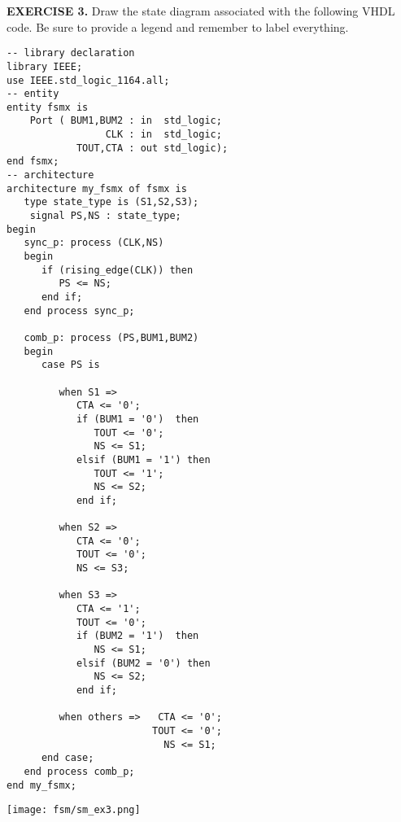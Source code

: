 \vspace{20pt}
\noindent
\begin{minipage}{1\textwidth}
\textbf{EXERCISE 3.}
Draw the state diagram associated with the following VHDL code. Be sure to provide a legend and remember to label everything.
\end{minipage}
\begin{minipage}{0.66\textwidth}
\vspace{10px}
\begin{lstlisting}
-- library declaration
library IEEE;
use IEEE.std_logic_1164.all;
-- entity
entity fsmx is
    Port ( BUM1,BUM2 : in  std_logic;
                 CLK : in  std_logic;
            TOUT,CTA : out std_logic);
end fsmx;
-- architecture
architecture my_fsmx of fsmx is
   type state_type is (S1,S2,S3);
	signal PS,NS : state_type;
begin
   sync_p: process (CLK,NS)
   begin
      if (rising_edge(CLK)) then
         PS <= NS;
      end if;
   end process sync_p;

   comb_p: process (PS,BUM1,BUM2)
   begin
      case PS is

         when S1 =>
            CTA <= '0';
            if (BUM1 = '0')  then
               TOUT <= '0';
               NS <= S1;
            elsif (BUM1 = '1') then
               TOUT <= '1';
               NS <= S2;
            end if;

         when S2 =>
            CTA <= '0';
            TOUT <= '0';
            NS <= S3;

         when S3 =>
            CTA <= '1';
            TOUT <= '0';
            if (BUM2 = '1')  then
               NS <= S1;
            elsif (BUM2 = '0') then
               NS <= S2;
            end if;

         when others =>   CTA <= '0';
                         TOUT <= '0';
                           NS <= S1;
      end case;
   end process comb_p;
end my_fsmx;
\end{lstlisting}
\end{minipage}
\begin{minipage}{0.33\textwidth}
\texttt{[image: fsm/sm\_ex3.png]}
\vspace{250px}
\end{minipage}

